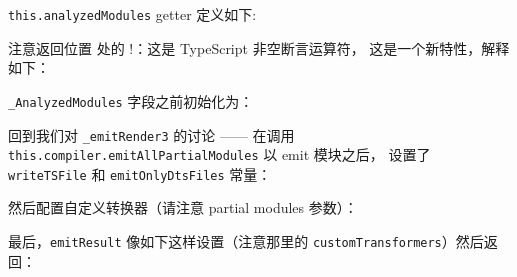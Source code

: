 
\texttt{this.analyzedModules} getter 定义如下:




注意返回位置  处的 !：这是 TypeScript 非空断言运算符，
这是一个新特性，解释如下：



\texttt{\_AnalyzedModules} 字段之前初始化为：




回到我们对 \texttt{\_emitRender3} 的讨论 —— 在调用 \texttt{this.compiler.emitAllPartialModules} 以 emit 模块之后，
设置了 \texttt{writeTSFile} 和 \texttt{emitOnlyDtsFiles} 常量：




然后配置自定义转换器（请注意 partial modules 参数）：




最后，\texttt{emitResult} 像如下这样设置（注意那里的 \texttt{customTransformers}）然后返回：



